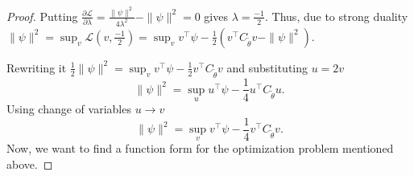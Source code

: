 \documentclass{article}
\def\gL{{\mathcal{L}}}
\theoremstyle{definition}
\begin{document}
\begin{proof}
    
    
    
    Putting $\frac{   \partial\gL}{\partial \lambda}= \frac{\|\psi\|^2}{4\lambda^2} -\|\psi\|^2=0$ gives $\lambda=\frac{-1}{2}.$ Thus, due to strong duality $\|\psi\|^2= \sup_{v} \gL(v,\frac{-1}{2})= \sup_{v} v^\top \psi-\frac{1}{2}(v^\top C_{\tilde{\theta}}v - \|\psi\|^2).$ 
    
    Rewriting it $\frac{1}{2}\|\psi\|^2= \sup_{v}   v^\top \psi-\frac{1}{2}v^\top C_{\tilde{\theta}}v$ and substituting $u=2v$
    \begin{equation*}
        \|\psi\|^2= \sup_{u}   u^\top \psi-\frac{1}{4}u^\top C_{\tilde{\theta}}u .
    \end{equation*}
    Using change of variables $u\rightarrow v$
       \begin{equation*}
        \|\psi\|^2= \sup_{v}   v^\top \psi-\frac{1}{4}v^\top C_{\tilde{\theta}}v.
    \end{equation*}
    Now, we want to find a function form for the optimization problem mentioned above.


\end{proof}
\end{document}
